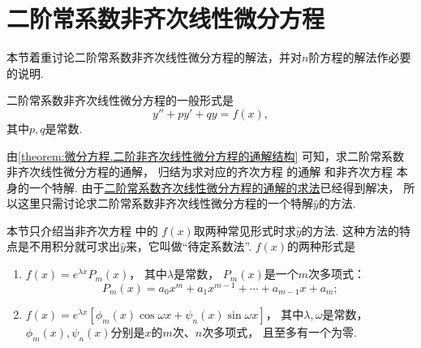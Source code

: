 \section{二阶常系数非齐次线性微分方程}\label{section:微分方程.常系数非齐次线性微分方程}
本节着重讨论二阶常系数非齐次线性微分方程的解法，并对\(n\)阶方程的解法作必要的说明.

二阶常系数非齐次线性微分方程的一般形式是
\begin{equation}\label{equation:微分方程.二阶常系数非齐次线性微分方程的一般形式}
y'' + p y' + q y = f(x),
\end{equation}
其中\(p,q\)是常数.

由\cref{theorem:微分方程.二阶非齐次线性微分方程的通解结构} 可知，求二阶常系数非齐次线性微分方程的通解，
归结为求对应的齐次方程  的通解
和非齐次方程  本身的一个特解.
由于\hyperref[section:微分方程.常系数齐次线性微分方程]{二阶常系数齐次线性微分方程的通解的求法}已经得到解决，
所以这里只需讨论求二阶常系数非齐次线性微分方程的一个特解\(\hat{y}\)的方法.

本节只介绍当非齐次方程  中的
\(f(x)\)取两种常见形式时求\(\hat{y}\)的方法.
这种方法的特点是不用积分就可求出\(\hat{y}\)来，它叫做“待定系数法”.
\(f(x)\)的两种形式是\begin{enumerate}
	\item \(f(x) = e^{\lambda x} P_m(x)\)，
	其中\(\lambda\)是常数，
	\(P_m(x)\)是一个\(m\)次多项式：\begin{equation*}
		P_m(x) = a_0 x^m + a_1 x^{m-1} + \dotsb + a_{m-1} x + a_m;
	\end{equation*}

	\item \(f(x) = e^{\lambda x} [ \phi_m(x) \cos\omega x + \psi_n(x) \sin \omega x ]\)，
	其中\(\lambda,\omega\)是常数，
	\(\phi_m(x),\psi_n(x)\)分别是\(x\)的\(m\)次、\(n\)次多项式，
	且至多有一个为零.
\end{enumerate}

